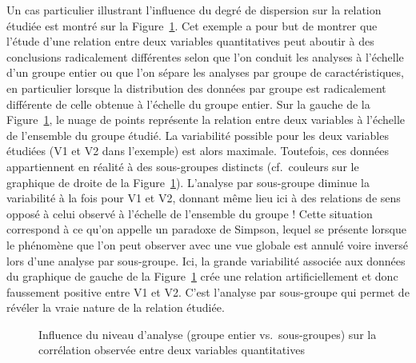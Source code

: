 \documentclass[
  letterpaper,
]{book}
\begin{document}
Un cas particulier illustrant l'influence du degré de dispersion sur la
relation étudiée est montré sur la Figure~\ref{fig-simpsonquant}. Cet
exemple a pour but de montrer que l'étude d'une relation entre deux
variables quantitatives peut aboutir à des conclusions radicalement
différentes selon que l'on conduit les analyses à l'échelle d'un groupe
entier ou que l'on sépare les analyses par groupe de caractéristiques,
en particulier lorsque la distribution des données par groupe est
radicalement différente de celle obtenue à l'échelle du groupe entier.
Sur la gauche de la Figure~\ref{fig-simpsonquant}, le nuage de points
représente la relation entre deux variables à l'échelle de l'ensemble du
groupe étudié. La variabilité possible pour les deux variables étudiées
(V1 et V2 dans l'exemple) est alors maximale. Toutefois, ces données
appartiennent en réalité à des sous-groupes distincts (cf.~couleurs sur
le graphique de droite de la Figure~\ref{fig-simpsonquant}). L'analyse
par sous-groupe diminue la variabilité à la fois pour V1 et V2, donnant
même lieu ici à des relations de sens opposé à celui observé à l'échelle
de l'ensemble du groupe ! Cette situation correspond à ce qu'on appelle
un paradoxe de Simpson, lequel se présente lorsque le phénomène que l'on
peut observer avec une vue globale est annulé voire inversé lors d'une
analyse par sous-groupe. Ici, la grande variabilité associée aux données
du graphique de gauche de la Figure~\ref{fig-simpsonquant} crée une
relation artificiellement et donc faussement positive entre V1 et V2.
C'est l'analyse par sous-groupe qui permet de révéler la vraie nature de
la relation étudiée.

\begin{figure}


\caption{\label{fig-simpsonquant}Influence du niveau d'analyse (groupe
entier vs.~sous-groupes) sur la corrélation observée entre deux
variables quantitatives}

\end{figure}%
\end{document}
